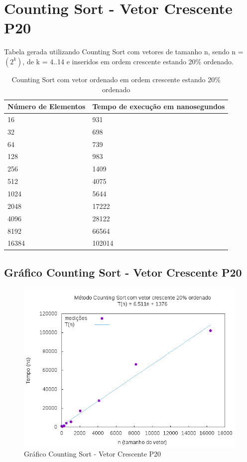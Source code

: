 \documentclass[12pt,a4paper,twoside]{report}
\begin{document}
\section{Counting Sort - Vetor Crescente P20}
Tabela gerada utilizando Counting Sort com vetores de tamanho n, sendo n = $(2^k)$, de k = 4..14 e inseridos em ordem crescente estando 20\% ordenado.
\begin{table}[H]
\centering
\caption{Counting Sort com vetor ordenado em ordem crescente estando 20\% ordenado}
\label{my-label}
\begin{tabular}{|l|l|}
\hline
\multicolumn{1}{|c|}{\textbf{Número de Elementos}} & \multicolumn{1}{c|}{\textbf{Tempo de execução em nanosegundos}} \\ \hline
16 & 931 \\ \hline
32 & 698 \\ \hline
64 & 739 \\ \hline
128 & 983 \\ \hline
256 & 1409 \\ \hline
512 & 4075 \\ \hline
1024 & 5644 \\ \hline
2048 & 17222 \\ \hline
4096 & 28122 \\ \hline
8192 & 66564 \\ \hline
16384 & 102014 \\ \hline
\end{tabular}
\end{table}

\subsection{Gráfico Counting Sort - Vetor Crescente P20}
\begin{figure}[H]
    \centering
    \includegraphics[width=0.7\linewidth]{graficos/CountingSort/vIntCrescenteP20/vIntCrescenteP20.png}
  \caption{Gráfico Counting Sort - Vetor Crescente P20}
\end{figure}
\end{document}
